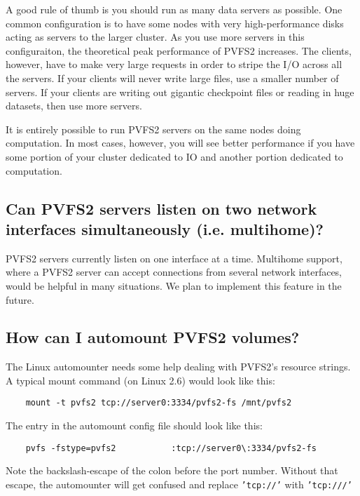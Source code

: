 \documentclass[11pt,letterpaper]{article}
\begin{document}
A good rule of thumb is you should run as many data servers as possible.
One common configuration is to have some nodes with very
high-performance disks acting as servers to the larger cluster.  As you
use more servers in this configuraiton, the theoretical peak performance
of PVFS2 increases.  The clients, however, have to make very large
requests in order to stripe the I/O across all the servers.  If your
clients will never write large files, use a smaller number of servers.
If your clients are writing out gigantic checkpoint files or reading in
huge datasets, then use more servers.

It is entirely possible to run PVFS2 servers on the same nodes doing
computation. In most cases, however, you will see better performance if 
you have some portion of your cluster dedicated to IO and another portion
dedicated to computation.


\subsection{Can PVFS2 servers listen on two network interfaces simultaneously (i.e. multihome)?}

PVFS2 servers currently listen on one interface at a time.  Multihome
support, where a PVFS2 server can accept connections from several
network interfaces, would be helpful in many situations.  We plan to
implement this feature in the future.

\subsection{How can I automount PVFS2 volumes?}

The Linux automounter needs some help dealing with PVFS2's resource strings.  A
typical mount command (on Linux 2.6) would look like this:

\begin{verbatim}
	mount -t pvfs2 tcp://server0:3334/pvfs2-fs /mnt/pvfs2
\end{verbatim}

The entry in the automount config file should look like this:

\begin{verbatim}
	pvfs -fstype=pvfs2           :tcp://server0\:3334/pvfs2-fs
\end{verbatim}

Note the backslash-escape of the colon before the port number.  Without that
escape, the automounter will get confused and replace \texttt{'tcp://'} with
\texttt{'tcp:///'}
\end{document}
